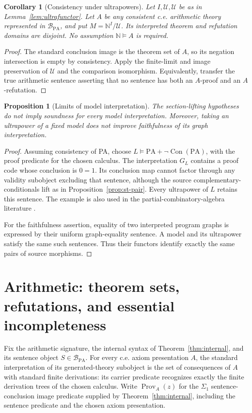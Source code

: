 \documentclass[11pt]{article}
\newtheorem{proposition}[theorem]{Proposition}
\newtheorem{corollary}[theorem]{Corollary}
\theoremstyle{definition}\newtheorem{definition}[theorem]{Definition}
\newcommand{\PA}{\mathrm{PA}}
\newcommand{\N}{\mathbb N}
\newcommand{\Con}{\operatorname{Con}}
\newcommand{\Prov}{\operatorname{Prov}}
\newcommand{\B}{\mathcal B}
\newcommand{\U}{\mathcal U}
\begin{document}
\begin{corollary}[Consistency under ultrapowers]\label{cor:consistency}
Let $I,\U,\mathscr U$ be as in Lemma~\ref{lem:ultrafunctor}.
Let $A$ be any consistent c.e. arithmetic theory represented in
$\B_{\PA}$, and put $M=\N^I/\U$. Its interpreted theorem and
refutation domains are disjoint. No assumption $\N\models A$
is required.
\end{corollary}
\begin{proof}
The standard conclusion image is the theorem set of $A$,
so its negation intersection is empty by consistency. Apply the
finite-limit and image preservation of $\mathscr U$ and the
comparison isomorphism. Equivalently, transfer the true arithmetic
sentence asserting that no sentence has both an $A$-proof and an
$A$-refutation.
\end{proof}

\begin{proposition}[Limits of model interpretation]\label{prop:limits}
The section-lifting hypotheses do not imply soundness for every model
interpretation. Moreover, taking an ultrapower of a fixed model does
not improve faithfulness of its graph interpretation.
\end{proposition}
\begin{proof}
Assuming consistency of PA, choose
$L\models\PA+\neg\Con(\PA)$, with the proof predicate for the
chosen calculus. The interpretation $G_L$ contains a proof code whose
conclusion is $0=1$. Its conclusion map cannot factor through any
validity subobject excluding that sentence, although the source
complementary-conditionals lift as in Proposition~\ref{prop:st-pair}.
Every ultrapower of $L$ retains this sentence. The example is also
used in the partial-combinatory-algebra literature \cite[\S7]{Terwijn}.

For the faithfulness assertion, equality of two interpreted program
graphs is expressed by their uniform graph-equality sentence. A
model and its ultrapower satisfy the same such sentences. Thus
their functors identify exactly the same pairs of source morphisms.
\end{proof}

\section{Arithmetic: theorem sets, refutations, and essential incompleteness}
Fix the arithmetic signature, the internal syntax of
Theorem~\ref{thm:internal}, and its sentence object $S\in\B_{\PA}$.
For every c.e. axiom presentation $A$, the standard interpretation
of its generated-theory subobject is the set of consequences of $A$
with standard finite derivations: its carrier predicate recognizes exactly the
finite derivation trees of the chosen calculus.
Write $\Prov_A(z)$ for the $\Sigma_1$ sentence-conclusion image
predicate supplied by Theorem~\ref{thm:internal}, including the
sentence predicate and the chosen axiom presentation.
\end{document}
